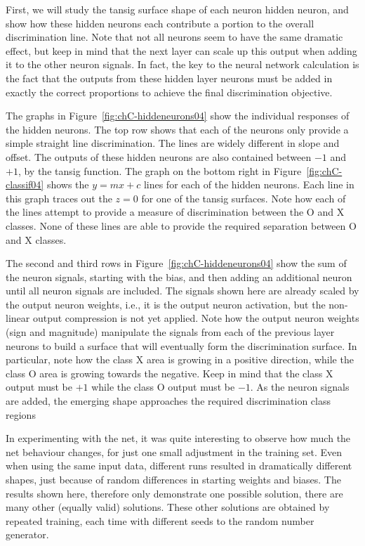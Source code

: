 First, we will study the tansig surface shape of each neuron hidden neuron, and show how these hidden neurons each contribute a portion to the overall discrimination line.  Note that not all neurons seem to have the same dramatic effect, but keep in mind that the next layer can scale up this output when adding it to the other neuron signals.  In fact, the key to the neural network calculation is the fact that the outputs from these hidden layer neurons must be added in exactly the correct proportions to achieve the final discrimination objective.  
 
The graphs in Figure~\ref{fig:chC-hiddeneurons04} show the individual responses of the hidden neurons.   The top row shows that each of the neurons only provide a simple straight line discrimination.   The lines are widely different in slope and offset.  The outputs of these hidden neurons are also contained between $-1$ and $+1$, by the tansig function.   
The graph on the bottom right in Figure~\ref{fig:chC-classif04} shows the $y=mx+c$ lines for each of the hidden neurons.  Each line in this graph  traces out the $z=0$  for one of the tansig surfaces.  Note how each of the lines attempt to provide a measure of discrimination between the O and X classes.  None of these lines are able to provide the required separation between O and X classes.   

The second and third rows in Figure~\ref{fig:chC-hiddeneurons04} show the sum of the neuron signals, starting with the bias, and then adding an additional neuron until all neuron signals are included.  The signals shown here are already scaled by the output neuron weights, i.e., it is the output neuron activation, but the non-linear output compression is not yet applied. 
Note how the output neuron weights (sign and magnitude) manipulate the signals from each of the previous layer neurons to build a surface that will eventually form the discrimination surface.  In particular, note how the class X area is growing in a positive direction, while the class O area is growing towards the negative.  Keep in mind that the class X output must be $+1$ while the class O output must be $-1$.  As the neuron signals are added, the emerging shape approaches the required discrimination class regions 


In experimenting with the net, it was quite interesting to observe how much the net behaviour changes, for just one small adjustment in the training set.  Even when using the same input data, different runs resulted in dramatically different shapes, just because of random differences in starting weights and biases.  The results shown here, therefore only demonstrate one possible solution, there are many other (equally valid) solutions.  These other solutions are obtained by repeated training, each time with different seeds to the random number generator. 




